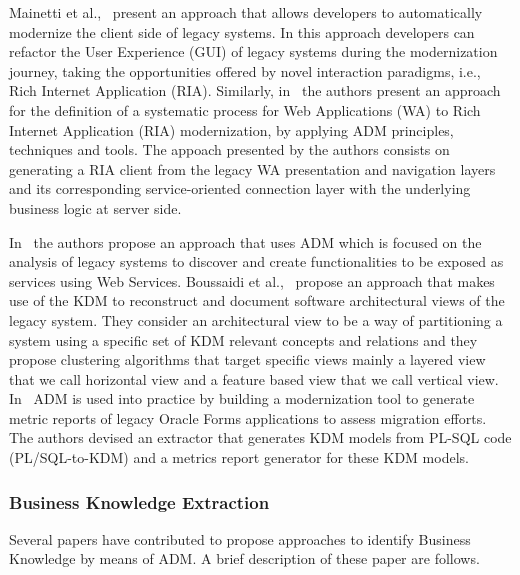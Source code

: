 Mainetti et al.,~\cite{Mainetti:2012:MMT:2364120.2364182} present an approach that allows developers to automatically modernize the client side of legacy systems. In this approach developers can refactor the User Experience (GUI) of legacy systems during the modernization journey, taking the opportunities offered by novel interaction paradigms, i.e., Rich Internet Application (RIA). Similarly, in~\cite{Rodriguez-Echeverria:2011:MLW:2186508.2186536} the authors present an approach for the definition of a systematic process for Web Applications (WA) to Rich Internet Application (RIA) modernization, by applying ADM principles, techniques and tools. The appoach presented by the authors consists on generating a RIA client from the legacy WA presentation and navigation layers and its corresponding service-oriented connection layer with the underlying business logic at server side.

In~\cite{4400179} the authors propose an approach that uses ADM which is focused on the analysis of legacy systems to discover and create functionalities to be exposed as services using Web Services. Boussaidi et al.,~\cite{6385130} propose an approach that makes use of the KDM to reconstruct and document software architectural views of the legacy system. They consider an architectural view to be a way of partitioning a system using a specific set of KDM relevant concepts and relations and they propose clustering algorithms that target specific views mainly a layered view that we call horizontal view and a feature based view that we call vertical view. In~\cite{5440163} ADM is used into practice by building a modernization tool to generate metric reports of legacy Oracle Forms applications to assess migration efforts. The authors devised an extractor that generates KDM models from PL-SQL code (PL/SQL-to-KDM) and a metrics report generator for these KDM models. 

\subsubsection{Business Knowledge Extraction}
\label{ssub:Business_Knowledge_Extraction}

Several papers have contributed to propose approaches to identify Business Knowledge by means of ADM. A brief description of these paper are follows.

